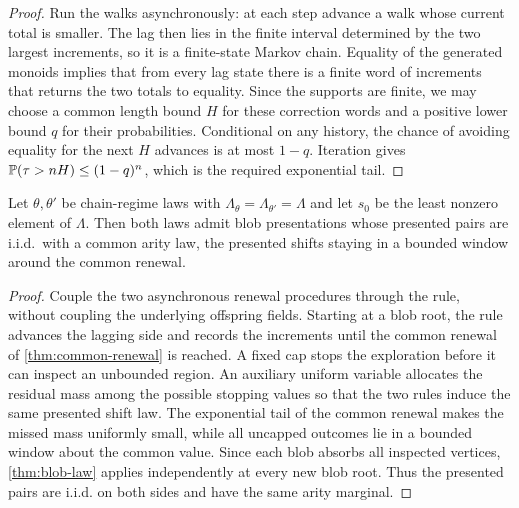 \begin{proof}
\leanok
{}
Run the walks asynchronously: at each step advance a walk whose current total is smaller. The lag
then lies in the finite interval determined by the two largest increments, so it is a finite-state
Markov chain. Equality of the generated monoids implies that from every lag state there is a
finite word of increments that returns the two totals to equality. Since the supports are finite,
we may choose a common length bound $H$ for these correction words and a positive lower bound
$q$ for their probabilities. Conditional on any history, the chance of avoiding equality for the
next $H$ advances is at most $1-q$. Iteration gives
$\mathbb{P}(\tau>nH)\leq(1-q)^n$, which is the required exponential tail.
\end{proof}

\begin{lemma}
\label{thm:matched-presentation}
\leanok
Let $\theta,\theta'$ be chain-regime laws with $\Lambda_{\theta}=\Lambda_{\theta'}=\Lambda$ and
let $s_0$ be the least nonzero element of $\Lambda$. Then both laws admit blob presentations
whose presented pairs are i.i.d.\ with a common arity law, the presented shifts staying in a
bounded window around the common renewal.
\end{lemma}

\begin{proof}
\leanok
{}
Couple the two asynchronous renewal procedures through the rule, without coupling the underlying
offspring fields. Starting at a blob root, the rule advances the lagging side and records the
increments until the common renewal of \cref{thm:common-renewal} is reached. A fixed cap stops the
exploration before it can inspect an unbounded region. An auxiliary uniform variable allocates
the residual mass among the possible stopping values so that the two rules induce the same
presented shift law. The exponential tail of the common renewal makes the missed mass uniformly
small, while all uncapped outcomes lie in a bounded window about the common value. Since each blob
absorbs all inspected vertices, \cref{thm:blob-law} applies independently at every new blob root.
Thus the presented pairs are i.i.d. on both sides and have the same arity marginal.
\end{proof}
